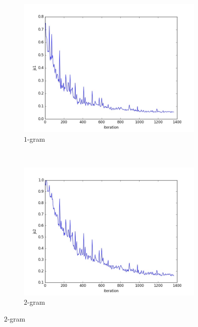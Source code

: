 \documentclass[10pt,a4paper]{article}
\begin{document}
\begin{figure}[H]
    \centering
    \begin{subfigure}[b]{0.4\textwidth}
        \includegraphics[width=\textwidth]{cuted/js1}
        \caption{$1$-gram}
    \end{subfigure}
    ~ 
    \begin{subfigure}[b]{0.4\textwidth}
        \includegraphics[width=\textwidth]{cuted/js2}
        \caption{$2$-gram}
    \end{subfigure}
    

\end{figure}
\end{document}
